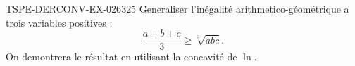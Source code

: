 \begin{exercice}{TSPE-DERCONV-EX-026}{3}{25}
Generaliser l'inégalité arithmetico-géométrique a trois variables positives :
\[ \frac{a+b+c}{3} \geq \sqrt[3]{abc}. \]
On demontrera le résultat en utilisant la concavité de $\ln$.

\end{exercice}
